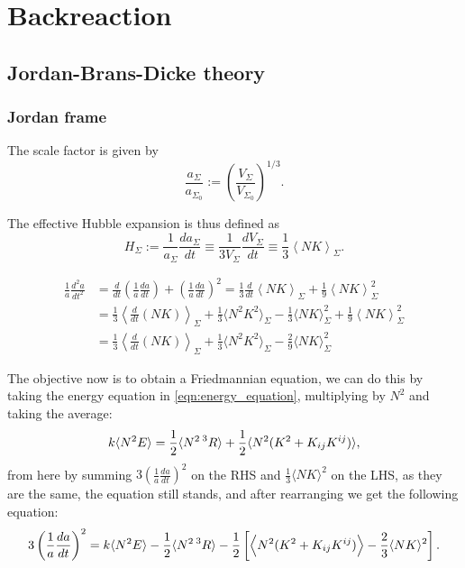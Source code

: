 \chapter{Backreaction}


\section{Jordan-Brans-Dicke theory}

\subsection{Jordan frame}

The scale factor is given by
\begin{equation}
    \frac{a_\Sigma}{a_{\Sigma_0}}:=\left(\frac{V_\Sigma}{V_{\Sigma_0}}\right)^{1/3}.
\end{equation}

The effective Hubble expansion is thus defined as
\begin{equation}
    H_{\Sigma} := \frac{1}{a_{\Sigma}}\frac{da_{\Sigma}}{dt}\equiv \frac{1}{3V_{\Sigma}}\frac{dV_{\Sigma}}{dt}\equiv\frac{1}{3}\left\langle NK \right\rangle_{\Sigma}.
    \label{eqn:def_scale_factor}
\end{equation}

\begin{align}
    \frac{1}{a}\frac{d^2a}{dt^2}&=\frac{d}{dt}\left(\frac{1}{a}\frac{da}{dt}\right)+\left(\frac{1}{a}\frac{da}{dt}\right)^2=\frac{1}{3}\frac{d}{dt}\left\langle NK \right\rangle_{\Sigma}+\frac{1}{9}\left\langle NK \right\rangle_{\Sigma}^2\nonumber\\
    &=\frac{1}{3}\left\langle \frac{d}{dt}(NK) \right\rangle_{\Sigma}+\frac{1}{3}\langle N^2K^2\rangle_{\Sigma}-\frac{1}{3}\langle NK\rangle^2_\Sigma+\frac{1}{9}\left\langle NK \right\rangle_{\Sigma}^2\nonumber\\
    &=\frac{1}{3}\left\langle \frac{d}{dt}(NK) \right\rangle_{\Sigma}+\frac{1}{3}\langle N^2K^2\rangle_{\Sigma}-\frac{2}{9}\langle NK\rangle^2_\Sigma
    \label{eqn:useful_51}
\end{align}


The objective now is to obtain a Friedmannian equation, we can do this by taking the energy equation in \cref{eqn:energy_equation}, multiplying by $N^2$ and taking the average:
\begin{equation}
    k\langle N^2E\rangle=\frac{1}{2}\langle N^2\prescript{3}{}{R}\rangle+\frac{1}{2}\langle N^2(K^2+K_{ij}K^{ij})\rangle,
\end{equation}
from here by summing $3\left(\frac{1}{a}\frac{da}{dt}\right)^2$ on the RHS and $\frac{1}{3}\langle NK\rangle^2$ on the LHS, as they are the same, the equation still stands, and after rearranging we get the following equation:
\begin{equation}
    3\left(\frac{1}{a}\frac{da}{dt}\right)^2=k\langle N^2E\rangle-\frac{1}{2}\langle N^2\prescript{3}{}{R}\rangle-\frac{1}{2}\left[\left\langle N^2(K^2+K_{ij}K^{ij})\right\rangle-\frac{2}{3}\langle NK\rangle^2\right].
\end{equation}


